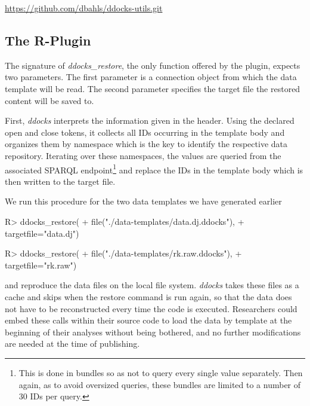 \documentclass{acm_proc_article-sp}
\begin{document}
%
%
\url{https://github.com/dbahls/ddocks-utils.git}



\subsection{The R-Plugin}


The signature of \textit{ddocks\_restore}, the only function offered by the plugin, expects two parameters.
The first parameter is a connection object from which the data template will be read.
The second parameter specifies the target file the restored content will be saved to.

First, \textit{ddocks} interprets the information given in the header.
Using the declared open and close tokens, it collects all IDs occurring in the template body and organizes them by namespace which is the key to identify the respective data repository.
Iterating over these namespaces, the values are queried from the associated SPARQL endpoint\footnote{This is done in bundles so as not to query every single value separately. Then again, as to avoid oversized queries, these bundles are limited to a number of 30 IDs per query.}
and replace the IDs in the template body which is then written to the target file.



We run this procedure for the two data templates we have generated earlier
\begin{Schunk}
\begin{Sinput}
R> ddocks_restore(
+    file("./data-templates/data.dj.ddocks"), 
+    targetfile="data.dj")
\end{Sinput}
\end{Schunk}

\begin{Schunk}
\begin{Sinput}
R> ddocks_restore(
+    file("./data-templates/rk.raw.ddocks"), 
+    targetfile="rk.raw")
\end{Sinput}
\end{Schunk}
and reproduce the data files on the local file system.
\textit{ddocks} takes these files as a cache and skips when the restore command is run again, so that the data does not have to be reconstructed every time the code is executed.
Researchers could embed these calls within their source code to load the data by template at the beginning of their analyses without being bothered, and no further modifications are needed at the time of publishing.
\end{document}
